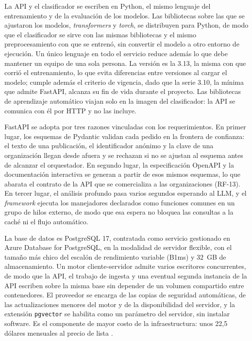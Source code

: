 La API y el clasificador se escriben en Python, el mismo lenguaje del entrenamiento y de la evaluación de los modelos. Las bibliotecas sobre las que se ajustaron los modelos, \textit{transformers} y \textit{torch}, se distribuyen para Python, de modo que el clasificador se sirve con las mismas bibliotecas y el mismo preprocesamiento con que se entrenó, sin convertir el modelo a otro entorno de ejecución. Un único lenguaje en todo el servicio reduce además lo que debe mantener un equipo de una sola persona. La versión es la 3.13, la misma con que corrió el entrenamiento, lo que evita diferencias entre versiones al cargar el modelo; cumple además el criterio de vigencia, dado que la serie 3.10, la mínima que admite FastAPI, alcanza su fin de vida durante el proyecto. Las bibliotecas de aprendizaje automático viajan solo en la imagen del clasificador: la API se comunica con él por HTTP y no las incluye.

FastAPI se adopta por tres razones vinculadas con los requerimientos. En primer lugar, los esquemas de Pydantic validan cada pedido en la frontera de confianza: el texto de una publicación, el identificador anónimo y la clave de una organización llegan desde afuera y se rechazan si no se ajustan al esquema antes de alcanzar el orquestador. En segundo lugar, la especificación OpenAPI y la documentación interactiva se generan a partir de esos mismos esquemas, lo que abarata el contrato de la API que se comercializa a las organizaciones (RF-13). En tercer lugar, el análisis profundo pasa varios segundos esperando al LLM, y el \textit{framework} ejecuta los manejadores declarados como funciones comunes en un grupo de hilos externo, de modo que esa espera no bloquea las consultas a la caché ni el flujo automático.

La base de datos es PostgreSQL 17, contratada como servicio gestionado en Azure Database for PostgreSQL, en la modalidad de servidor flexible, con el tamaño más chico del escalón de rendimiento variable (B1ms) y 32~GB de almacenamiento. Un motor cliente-servidor admite varios escritores concurrentes, de modo que la API, el trabajo de ingesta y una eventual segunda instancia de la API escriben sobre la misma base sin depender de un volumen compartido entre contenedores. El proveedor se encarga de las copias de seguridad automáticas, de las actualizaciones menores del motor y de la disponibilidad del servidor, y la extensión \texttt{pgvector} se habilita como un parámetro del servidor, sin instalar software. Es el componente de mayor costo de la infraestructura: unos 22,5 dólares mensuales al precio de lista \parencite{MicrosoftAzure2026}.

